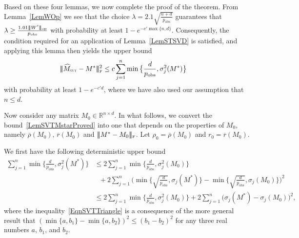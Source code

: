 \documentclass[11pt, hidelinks]{article} %
\newcommand{\matsnorm}[2]{|\!|\!| #1 | \! | \!|_{{#2}}}
\newcommand{\opnorm}[1]{\ensuremath{\matsnorm{#1}{\mbox{\tiny{op}}}}}
\newcommand{\frobnorm}[1]{\ensuremath{\matsnorm{#1}{\mbox{\tiny{F}}}}}
\newcommand{\reals}{\ensuremath{\mathbb{R}}}
\newcommand{\numrows}{n}
\newcommand{\numcols}{d}
\newcommand{\plaincon}{c}
\newcommand{\wtmatrix}{M}
\newcommand{\wt}{\wtmatrix}
\newcommand{\wtstar}{\wtmatrix^*}
\newcommand{\wthat}{\widehat{\wtmatrix}}
\newcommand{\pp}{\ensuremath{p_{\mathrm{obs}}}}
\newcommand{\nnrank}{r}
\newcommand{\permrank}{\rho}
\newcommand{\wtclosest}{\ensuremath{\wt_0}}
\newcommand{\fnpermrank}[1]{\overline{\permrank}(#1)}
\newcommand{\fnnnrank}[1]{\overline{\nnrank}(#1)}
\newcommand{\noise}{W}
\newcommand{\regpar}{\ensuremath{\lambda}}
\newcommand{\wthatSVT}{\wthat_{\mbox{\scalebox{.5}{SVT}}}}
\begin{document}
Based on these four lemmas, we now complete the proof of the
theorem. From Lemma~\ref{LemWOp} we see that the choice $\regpar = 2.1
\sqrt{\frac{\numrows + \numcols}{\pp}}$ guarantees that $\regpar \geq
\frac{1.01\opnorm{\noise'}}{\pp}$ with probability at least $1 -
e^{-\plaincon' \max\{\numrows, \numcols\}}$. Consequently, the
condition required for an application of Lemma~\ref{LemSTSVD} is
satisfied, and applying this lemma then yields the upper bound
\begin{align}
\label{LemSVTMstarProved}
\frobnorm{\wthatSVT - \wtstar}^2 & \leq \plaincon \sum_{j=1}^\numrows
\min \big \{ \frac{\numcols}{\pp}, \sigma_j^2(\wtstar) \big \}
\end{align}
with probability at least $1 - e^{-\plaincon' \numcols}$, where we have also used our assumption that $\numrows \leq \numcols$. 

Now consider any matrix $\wtclosest \in \reals^{\numrows \times \numcols}$. In what follows, we convert the bound~\eqref{LemSVTMstarProved} into one that depends on the properties of $\wtclosest$, namely $\fnpermrank{\wtclosest}$, $\fnnnrank{\wtclosest}$ and $\frobnorm{\wtstar - \wtclosest}$. Let $\permrank_0 = \fnpermrank{\wtclosest}$ and $\nnrank_0 = \fnnnrank{\wtclosest}$.

We first have the following deterministic upper bound
\begin{align}
\sum_{j=1}^\numrows
\min \big \{ \frac{\numcols}{\pp}, \sigma_j^2(\wtstar) \big \} & \leq 2 \sum_{j=1}^\numrows
\min \big \{ \frac{\numcols}{\pp}, \sigma_j^2(\wtclosest) \big \} \nonumber \\ 
&~~~ + 2 \sum_{j=1}^\numrows
\Big( \min \big \{ \sqrt{\frac{\numcols}{\pp}}, \sigma_j(\wtstar) \big \} - \min \big \{ \sqrt{\frac{\numcols}{\pp}}, \sigma_j(\wtclosest) \big  \} \Big)^2 \nonumber \\
& \leq 2 \sum_{j=1}^\numrows
\min \big \{ \frac{\numcols}{\pp}, \sigma_j^2(\wtclosest) \big \}  + 2 \sum_{j=1}^\numrows
\big( \sigma_j(\wtstar)  - \sigma_j(\wtclosest) \big)^2,
\label{EqnSVTTriangle}
\end{align}
where the inequality~\eqref{EqnSVTTriangle} is a consequence of the more general result that $(\min\{a,b_1\} - \min\{a,b_2\})^2 \leq (b_1 - b_2)^2$ for any three real numbers $a$, $b_1$, and $b_2$.
\end{document}
